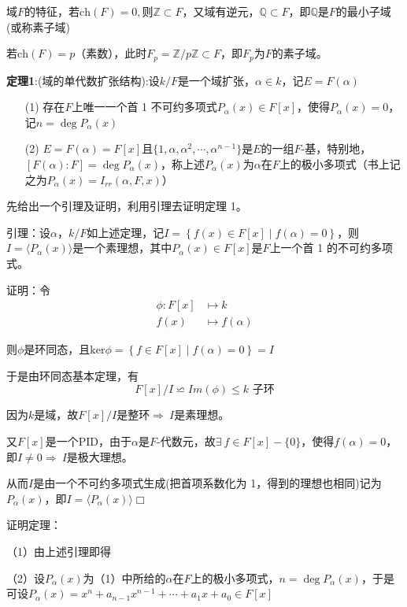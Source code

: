 \documentclass[UTF8]{article}
\begin{document}
域$F$的特征，若$\text{ch}(F)=0,$则$ \mathbb{Z}\subset F$，又域有逆元，$\mathbb{Q}\subset F$，即$\mathbb{Q}$是$F$的最小子域(或称素子域)

若$\text{ch}(F)=p$（素数），此时$F_p=\mathbb{Z}/p\mathbb{Z}\subset F$，即$F_p$为$F$的素子域。

\textbf{定理1}:(域的单代数扩张结构):设$k/F$是一个域扩张，$\alpha\in k$，记$E=F(\alpha)$
\begin{enumerate}
	\item[(1)] 存在$F$上唯一一个首 1 不可约多项式$P_{\alpha}(x)\in F[x]$，使得$P_{\alpha}(x)=0$，记$n=\operatorname{deg}P_{\alpha}(x)$
	\item[(2)] $E=F(\alpha)=F[x]$且$\{ 1,\alpha,\alpha^2,\cdots,\alpha^{n-1}\}$是$E$的一组$F$-基，特别地，$[F(\alpha): F]=\operatorname{deg}P_{\alpha}(x)$，称上述$P_{\alpha}(x)$为$\alpha$在$F$上的极小多项式（书上记之为$P_{\alpha}(x)=I_{rr}\left( \alpha, F, x\right)$）
\end{enumerate}

先给出一个引理及证明，利用引理去证明定理 1。

引理：设$\alpha$，$k/F$如上述定理，记$I=\left\{ f(x)\in F[x] \mid f(\alpha)=0\right\}$，则$I=\langle P_{\alpha}(x)\rangle$是一个素理想，其中$P_{\alpha}(x)\in F[x]$是$F$上一个首 1 的不可约多项式。

证明：令
\[\begin{split}
\phi:F[x]&\longmapsto k\\
f(x)&\longmapsto f(\alpha)
\end{split}
\]

\quad 则$\phi$是环同态，且$\text{ker}\phi=\left\{ f\in F[x] \mid f(\alpha)=0\right\}=I$

\quad 于是由环同态基本定理，有
$$
F[x]/I\backsimeq Im(\phi)\leqslant k\text{ 子环}
$$

\quad 因为$k$是域，故$F[x]/I$是整环$\Rightarrow\ I$是素理想。

\quad 又$F[x]$是一个PID，由于$\alpha$是$F$-代数元，故$\exists\ f\in F[x] - \{ 0\}$，使得$f(\alpha)=0$，即$I\neq 0\Rightarrow\ I$是极大理想。

\quad 从而$I$是由一个不可约多项式生成(把首项系数化为 1，得到的理想也相同)记为$P_{\alpha}(x)$，即$I=\langle P_{\alpha}(x)\rangle$\hfill$\Box$

证明定理：

（1）由上述引理即得

（2）设$P_{\alpha}(x)$为（1）中所给的$\alpha$在$F$上的极小多项式，$n=\operatorname{deg}P_{\alpha}(x)$，于是可设$P_{\alpha}(x)=x^n+a_{n-1}x^{n-1}+\cdots +a_1x+a_0\in F[x]$
\end{document}
